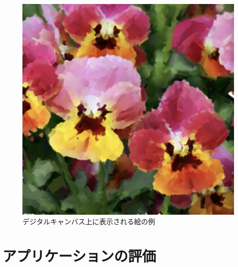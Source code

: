 \begin{figure}[t]
\begin{minipage}[b]{0.32\hsize}
    \end{minipage}
    \begin{minipage}[b]{0.32\hsize}
        \centering
        \includegraphics[width=1.0\hsize]{img/art/perfect.png}
    \end{minipage}
    \caption{デジタルキャンバス上に表示される絵の例}
    \label{fig:app-art}
\end{figure}

\section{アプリケーションの評価}

